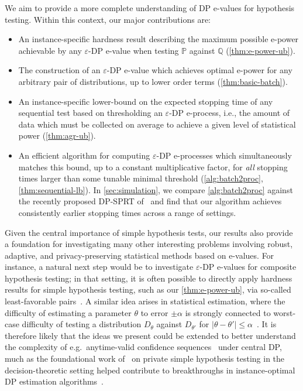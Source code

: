 \documentclass{article}
\newcommand{\Null}{\mathbb{P}}
\newcommand{\Alt}{\mathbb{Q}}
\newcommand{\eps}{\varepsilon}
\begin{document}
We aim to provide a more complete understanding of DP e-values for hypothesis testing. 
Within this context, our major contributions are:
\begin{itemize}
    \item An instance-specific hardness result describing the maximum possible e-power achievable by any $\varepsilon$-DP e-value when testing $\Null$ against $\Alt$ (\cref{thm:e-power-ub}).
    \item The construction of an $\eps$-DP e-value which achieves optimal e-power for any arbitrary pair of distributions, up to lower order terms (\cref{thm:basic-batch}).
    \item An instance-specific lower-bound on the expected stopping time of any sequential test based on thresholding an $\eps$-DP e-process, i.e., the amount of data which must be collected on average to achieve a given level of statistical power (\cref{thm:agr-ub}).
    \item An efficient algorithm for computing $\eps$-DP e-processes which simultaneously matches this bound, up to a constant multiplicative factor, for \emph{all} stopping times larger than some tunable minimal threshold (\cref{alg:batch2proc}, \cref{thm:sequential-lb}). In \cref{sec:simulation}, we compare \cref{alg:batch2proc} against the recently proposed DP-SPRT of~\citet{michel2026dpsprtdifferentiallyprivatesequential} and find that our algorithm achieves consistently earlier stopping times across a range of settings.
\end{itemize}


Given the central importance of simple hypothesis tests, our results also provide a foundation for investigating many other interesting problems involving robust, adaptive, and privacy-preserving statistical methods based on e-values. For instance, a natural next step would be to investigate $\eps$-DP e-values for composite hypothesis testing; in that setting, it is often possible to directly apply hardness results for simple hypothesis testing, such as our \cref{thm:e-power-ub}, via so-called least-favorable pairs~\citep{huber1973minimax}. A similar idea arises in statistical estimation, where the difficulty of estimating a parameter $\theta$ to error $\pm \alpha$ is strongly connected to worst-case difficulty of testing a distribution $D_\theta$ against $D_{\theta'}$ for $|\theta - \theta'| \leq \alpha$~\citep{donoho1991geometrizingII}. It is therefore likely that the ideas we present could be extended to better understand the complexity of e.g.\ anytime-valid confidence sequences~\citep{ramdasAdmissibleAnytimevalidSequential2022,ramdas2023game} under central DP, much as the foundational work of~\citet{canonne2019structure} on private simple hypothesis testing in the decision-theoretic setting helped contribute to breakthroughs in instance-optimal DP estimation algorithms~\citep{mcmillan2022instanceoptimaldifferentiallyprivateestimation,universally-instance-optimal-mechanisms}. 
\end{document}
